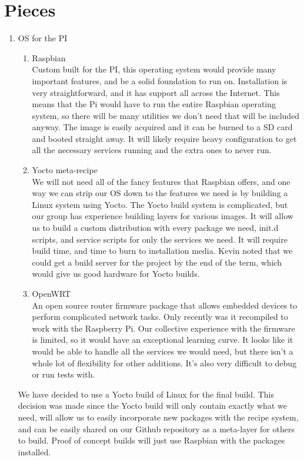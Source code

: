 \documentclass[12pt]{article}
\begin{document}
\section{Pieces}

\begin{enumerate}
    \item OS for the PI
        \begin{enumerate}
            \item Raspbian \\
                Custom built for the PI, this operating system would provide many important features, and be a solid foundation to run on. Installation is very straightforward, and it has support all across the Internet. This means that the Pi would have to run the entire Raspbian operating system, so there will be many utilities we don't need that will be included anyway. The image is easily acquired and it can be burned to a SD card and booted straight away. It will likely require heavy configuration to get all the necessary services running and the extra ones to never run.
            \item Yocto meta-recipe \\
                We will not need all of the fancy features that Raspbian offers, and one way we can strip our OS down to the features we need is by building a Linux system using Yocto. The Yocto build system is complicated, but our group has experience building layers for various images. It will allow us to build a custom distribution with every package we need, init.d scripts, and service scripts for only the services we need. It will require build time, and time to burn to installation media. Kevin noted that we could get a build server for the project by the end of the term, which would give us good hardware for Yocto builds. 
            \item OpenWRT \\
                An open source router firmware package that allows embedded devices to perform complicated network tasks. Only recently was it recompiled to work with the Raspberry Pi. Our collective experience with the firmware is limited, so it would have an exceptional learning curve. It looks like it would be able to handle all the services we would need, but there isn't a whole lot of flexibility for other additions. It's also very difficult to debug or run tests with. 
        \end{enumerate}
        We have decided to use a Yocto build of Linux for the final build. This decision was made since the Yocto build will only contain exactly what we need, will allow us to easily incorporate new packages with the recipe system, and can be easily shared on our Github repository as a meta-layer for others to build. Proof of concept builds will just use Raspbian with the packages installed.

\end{enumerate}
\end{document}
